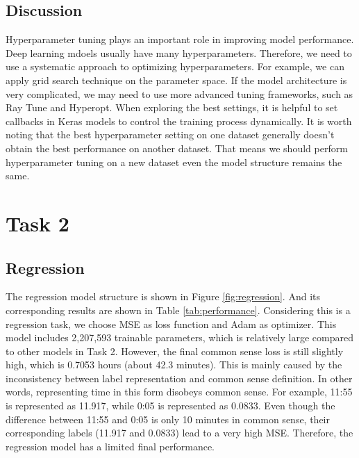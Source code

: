 \documentclass{article}
\begin{document}
\subsection{Discussion}
Hyperparameter tuning plays an important role in improving model performance. Deep learning mdoels usually have many hyperparameters. Therefore, we need to use a systematic approach to optimizing hyperparameters. For example, we can apply grid search technique on the parameter space. If the model architecture is very complicated, we may need to use more advanced tuning frameworks, such as Ray Tune and Hyperopt. When exploring the best settings, it is helpful to set callbacks in Keras models to control the training process dynamically. It is worth noting that the best hyperparameter setting on one dataset generally doesn't obtain the best performance on another dataset. That means we should perform hyperparameter tuning on a new dataset even the model structure remains the same.

\section*{Task 2}
\setcounter{section}{2}
\setcounter{subsection}{0}
\subsection{Regression}
The regression model structure is shown in Figure \ref{fig:regression}. And its corresponding results are shown in Table \ref{tab:performance}. Considering this is a regression task, we choose MSE as loss function and Adam as optimizer. This model includes 2,207,593 trainable parameters, which is relatively large compared to other models in Task 2. However, the final common sense loss is still slightly high, which is 0.7053 hours (about 42.3 minutes). This is mainly caused by the inconsistency between label representation and common sense definition. In other words, representing time in this form disobeys common sense. For example, 11:55 is represented as 11.917, while 0:05 is represented as 0.0833. Even though the difference between 11:55 and 0:05 is only 10 minutes in common sense, their corresponding labels (11.917 and 0.0833) lead to a very high MSE. Therefore, the regression model has a limited final performance.
\end{document}
